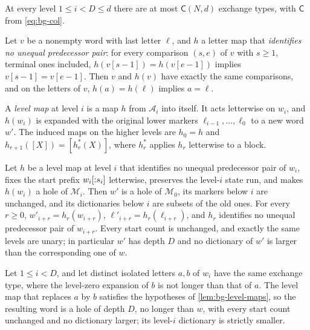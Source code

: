 \begin{lemma}\label{lem:bg-exchange-types}
At every level $1\le i<D\le d$ there are at most $\mathsf C(N,d)$ exchange
types, with $\mathsf C$ from \cref{eq:bg-col}.
\end{lemma}

\begin{lemma}\label{lem:bg-comparison-map}
Let $v$ be a nonempty word with last letter $\ell$, and $h$ a letter map that
\emph{identifies no unequal predecessor pair}: for every comparison $(s,e)$ of
$v$ with $s\ge1$, terminal ones included, $h(v[s-1])=h(v[e-1])$ implies
$v[s-1]=v[e-1]$. Then $v$ and $h(v)$ have exactly the same comparisons, and on
the letters of $v$, $h(a)=h(\ell)$ implies $a=\ell$.
\end{lemma}

A \emph{level map} at level $i$ is a map $h$ from $\mathcal A_i$ into itself. It
acts letterwise on $w_i$, and $h(w_i)$ is expanded with the original lower
markers $\ell_{i-1},\ldots,\ell_0$ to a new word $w'$. The induced maps on the
higher levels are $h_0=h$ and $h_{r+1}([X])=[h_r^*(X)]$, where $h_r^*$ applies
$h_r$ letterwise to a block.

\begin{lemma}\label{lem:bg-level-maps}
Let $h$ be a level map at level $i$ that identifies no unequal predecessor pair
of $w_i$, fixes the start prefix $w_i[{:}s_i]$ letterwise, preserves the
level-$i$ state run, and makes $h(w_i)$ a hole of $\mathcal M_i$. Then $w'$ is a
hole of $\mathcal M_0$, its markers below $i$ are unchanged, and its dictionaries
below $i$ are subsets of the old ones. For every $r\ge0$,
$w'_{i+r}=h_r(w_{i+r})$, $\ell'_{i+r}=h_r(\ell_{i+r})$, and $h_r$ identifies no
unequal predecessor pair of $w_{i+r}$. Every start count is unchanged, and
exactly the same levels are unary; in particular $w'$ has depth $D$ and no
dictionary of $w'$ is larger than the corresponding one of $w$.
\end{lemma}

\begin{lemma}\label{lem:bg-isolated-exchange}
Let $1\le i<D$, and let distinct isolated letters $a,b$ of $w_i$ have the same
exchange type, where the level-zero expansion of $b$ is not longer than that
of $a$. The level map that replaces $a$ by $b$ satisfies the hypotheses of
\cref{lem:bg-level-maps}, so the resulting word is a hole of depth $D$, no
longer than $w$, with every start count unchanged and no dictionary larger;
its level-$i$ dictionary is strictly smaller.
\end{lemma}

